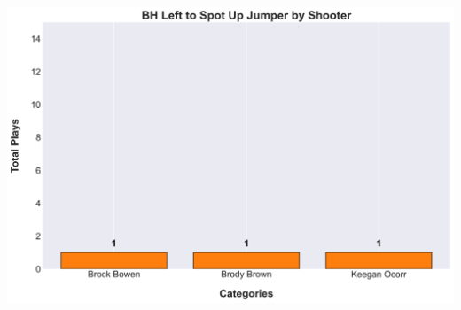 \documentclass[a4paper,12pt]{article}
\begin{document}
\begin{table}[H]
{\begin{minipage}[t]{0.6\textwidth}
{\begin{tabular}
                
            
                
            
                
            
                
            
                
            
                
            
                
            
                
            
                
            
                
            
            \bottomrule
        \end{tabular}
        } %
    \end{minipage}
    } %
    \hfill %
    \begin{minipage}[c]{0.35\textwidth} %
        \flushright
        \includegraphics[width=\textwidth, height=.14\textheight]{images/PNR_PassLeftShotsPlayer_Freq.png} %
    \end{minipage}
\end{table}

\vspace{-1em} %
\vspace{-1em} %
\end{document}
